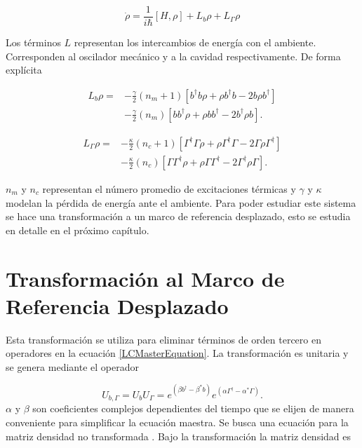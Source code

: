 \documentclass[10pt,a4paper]{report}
\begin{document}
\begin{equation} \label{LCMasterEquation}
\dot{\rho} = \frac{1}{i\hbar}[H,\rho] +L_b\rho + L_\Gamma \rho
\end{equation}

Los términos $L$ representan los intercambios de energía con el ambiente. Corresponden al oscilador mecánico y a la cavidad respectivamente. De forma explícita

\begin{align}
L_b \rho =& - \frac{\gamma}{2}(n_m + 1)[b^\dagger b\rho + \rho b^\dagger b -2b\rho b^\dagger]  \\
 &- \frac{\gamma}{2}(n_m)[ bb^\dagger\rho + \rho  bb^\dagger -2b^\dagger\rho b].\nonumber
\end{align} 

\begin{align}
L_\Gamma \rho =& - \frac{\kappa}{2}(n_c + 1)[\Gamma^\dagger \Gamma\rho + \rho \Gamma^\dagger \Gamma -2\Gamma\rho \Gamma^\dagger]  \\
 &- \frac{\kappa}{2}(n_c)[ \Gamma\Gamma^\dagger\rho + \rho  \Gamma\Gamma^\dagger -2\Gamma^\dagger\rho \Gamma].\nonumber
\end{align}

$n_m$ y $n_c$ representan el número promedio de excitaciones térmicas y $\gamma$ y $\kappa$ modelan la pérdida de energía ante el ambiente. Para poder estudiar este sistema se hace una transformación a  un marco de referencia desplazado, esto se estudia en detalle en el próximo capítulo.

\chapter{Transformación al Marco de Referencia Desplazado}

Esta transformación se utiliza para eliminar términos de orden tercero en operadores en la ecuación \eqref{LCMasterEquation}. La transformación es unitaria y se genera mediante el operador

\begin{equation}
U_{b,\Gamma} =  U_b U_\Gamma = e^{(\beta b^\dagger - \beta^* b)}e^{(\alpha\Gamma^\dagger - \alpha^* \Gamma)}.
\end{equation} $\alpha$ y $\beta$ son coeficientes complejos dependientes del tiempo que se elijen de manera conveniente para simplificar la ecuación maestra. Se busca una ecuación para la matriz densidad no transformada \cite{TesisMaestria}. Bajo la transformación la matriz densidad es
\end{document}
